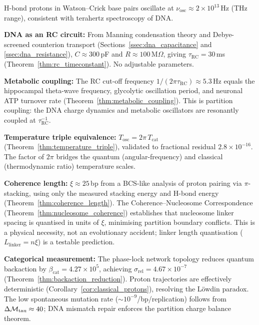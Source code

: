 \begin{chapterbox}
H-bond protons in Watson--Crick base pairs oscillate at
$\nu_{\mathrm{osc}} \approx 2 \times 10^{13}$\,Hz (THz range), consistent
with terahertz spectroscopy of DNA.

\medskip
\noindent\textbf{DNA as an RC circuit:} From Manning condensation theory and
Debye-screened counterion transport (Sections~\ref{ssec:dna_capacitance}
and \ref{ssec:dna_resistance}), $C \approx 300$\,pF and $R \approx 100$\,M$\Omega$,
giving $\tau_{\mathrm{RC}} = 30$\,ms (Theorem~\ref{thm:rc_timeconstant}).
No adjustable parameters.

\medskip
\noindent\textbf{Metabolic coupling:} The RC cut-off frequency
$1/(2\pi\tau_{\mathrm{RC}}) \approx 5.3$\,Hz equals the hippocampal theta-wave
frequency, glycolytic oscillation period, and neuronal ATP turnover rate
(Theorem~\ref{thm:metabolic_coupling}). This is partition coupling:
the DNA charge dynamics and metabolic oscillators are resonantly coupled at
$\tau_{\mathrm{RC}}^{-1}$.

\medskip
\noindent\textbf{Temperature triple equivalence:}
$T_{\mathrm{osc}} = 2\pi\,T_{\mathrm{cat}}$
(Theorem~\ref{thm:temperature_triple}), validated to fractional residual
$2.8 \times 10^{-16}$. The factor of $2\pi$ bridges the quantum
(angular-frequency) and classical (thermodynamic ratio) temperature scales.

\medskip
\noindent\textbf{Coherence length:} $\xi \approx 25$\,bp from a BCS-like
analysis of proton pairing via $\pi$-stacking, using only the measured stacking
energy and H-bond energy (Theorem~\ref{thm:coherence_length}).
The Coherence--Nucleosome Correspondence (Theorem~\ref{thm:nucleosome_coherence})
establishes that nucleosome linker spacing is quantised in units of $\xi$,
minimising partition boundary conflicts. This is a physical necessity, not an
evolutionary accident; linker length quantisation ($L_{\mathrm{linker}} = n\xi$)
is a testable prediction.

\medskip
\noindent\textbf{Categorical measurement:} The phase-lock network topology
reduces quantum backaction by $\beta_{\mathrm{cat}} = 4.27 \times 10^5$,
achieving $\sigma_{\mathrm{rel}} = 4.67 \times 10^{-7}$
(Theorem~\ref{thm:backaction_reduction}). Proton trajectories are effectively
deterministic (Corollary~\ref{cor:classical_protons}), resolving the Löwdin
paradox. The low spontaneous mutation rate ($\sim 10^{-9}$/bp/replication)
follows from $\Delta\mathcal{M}_{\mathrm{tau}} \approx 40$; DNA mismatch repair
enforces the partition charge balance theorem.
\end{chapterbox}
